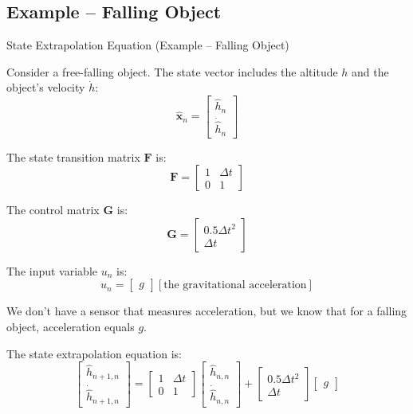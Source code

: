 \subsection{Example – Falling Object}
\begin{frame}{State Extrapolation Equation (Example – Falling Object)}

Consider a free-falling object. The state vector includes the altitude \(h\) and the object's velocity \(\dot{h}\):
\begin{equation}
\hat{\mathbf{x}}_n = 
\begin{bmatrix}
\hat{h}_n \\
\dot{\hat{h}}_n
\end{bmatrix}
\end{equation}

The state transition matrix \(\mathbf{F}\) is:
\begin{equation}
\mathbf{F} = 
\begin{bmatrix}
1 & \Delta t \\
0 & 1
\end{bmatrix}
\end{equation}

The control matrix \(\mathbf{G}\) is:
\begin{equation}
\mathbf{G} = 
\begin{bmatrix}
0.5\Delta t^2 \\
\Delta t
\end{bmatrix}
\end{equation}

The input variable \(u_n\) is:
\begin{equation}
u_n = 
\begin{bmatrix}
g 
\end{bmatrix}
[\text{the gravitational acceleration}]
\end{equation}

We don’t have a sensor that measures acceleration, but we know that for a falling object, acceleration equals \(g\).

The state extrapolation equation is:
\begin{equation}
\begin{bmatrix}
\hat{h}_{n+1,n} \\
\dot{\hat{h}}_{n+1,n}
\end{bmatrix}
=
\begin{bmatrix}
1 & \Delta t \\
0 & 1
\end{bmatrix}
\begin{bmatrix}
\hat{h}_{n,n} \\
\dot{\hat{h}}_{n,n}
\end{bmatrix}
+
\begin{bmatrix}
0.5\Delta t^2 \\
\Delta t
\end{bmatrix}
\begin{bmatrix}
g
\end{bmatrix}
\end{equation}


\end{frame}
